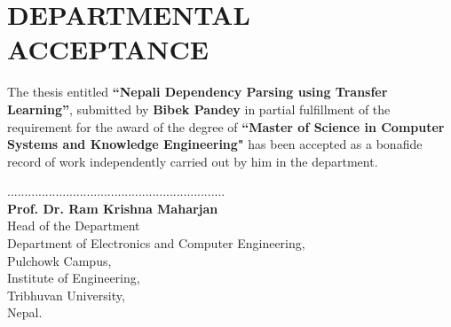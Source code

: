 
\chapter*{\vspace{3cm}DEPARTMENTAL ACCEPTANCE}
The thesis entitled \textbf{``Nepali Dependency Parsing using Transfer Learning''}, submitted by \textbf{Bibek Pandey} in partial fulfillment of the requirement for the award of the degree of \textbf{``Master of Science in Computer Systems and Knowledge Engineering"} has been accepted as a bonafide record of work independently carried out by him in the department.\par
\vspace{5cm}
...............................................................\\
\textbf{Prof. Dr. Ram Krishna Maharjan} \\
Head of the Department \\
Department of Electronics and Computer Engineering, \\
Pulchowk Campus, \\
Institute of Engineering, \\
Tribhuvan University, \\
Nepal.
\newpage
